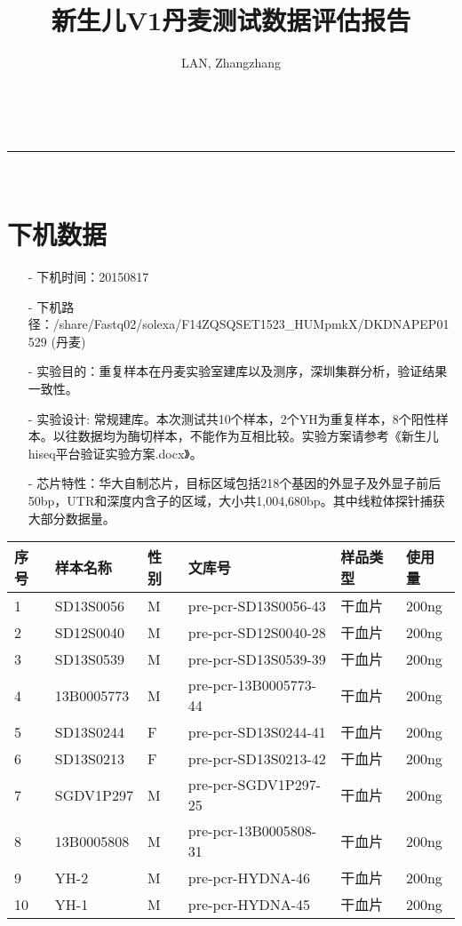 \documentclass[a4paper,11pt]{article}
\makeatletter
\newcommand{\linia}{\rule{\linewidth}{0.5pt}}
\newcommand{\tabcaption}{\def\@captype{table}\caption}
\theoremstyle{mytheor}
\renewcommand{\maketitle}{
	\begin{center}
	\vspace{2ex}
	{\huge \textsc{\@title}}
	\vspace{1ex}
	\\
		\linia\\
		\@author \hfill \@date
		\vspace{4ex}
	\end{center}
}
\makeatother
\begin{document}
\begin{CJK*}{UTF8}{gbsn}

\title{新生儿V1丹麦测试数据评估报告}
\author{LAN, Zhangzhang}
\maketitle

\section{下机数据}
\begin{itemize}\setlength{\itemsep}{0pt}
\item[-] 下机时间：20150817
\item[-] 下机路径：/share/Fastq02/solexa/F14ZQSQSET1523\_HUMpmkX/DKDNAPEP01529 (丹麦)
\item[-] 实验目的：重复样本在丹麦实验室建库以及测序，深圳集群分析，验证结果一致性。
\item[-] 实验设计: 常规建库。本次测试共10个样本，2个YH为重复样本，8个阳性样本。以往数据均为酶切样本，不能作为互相比较。实验方案请参考《新生儿hiseq平台验证实验方案.docx》。
\item[-] 芯片特性：华大自制芯片，目标区域包括218个基因的外显子及外显子前后50bp，UTR和深度内含子的区域，大小共1,004,680bp。其中线粒体探针捕获大部分数据量。
\end{itemize}


\begin{center}
\fontsize{10}{12} \selectfont
\begin{tabular}[t]{l|l|l|l|l|l}
\hline
序号	&	样本名称	&	性别	&	 文库号	&	样品类型	&	使用量	\\
\hline
1	&	SD13S0056	&	M	&	pre-pcr-SD13S0056-43	&	干血片	&	200ng	\\
2	&	SD12S0040	&	M	&	pre-pcr-SD12S0040-28	&	干血片	&	200ng	\\
3	&	SD13S0539	&	M	&	pre-pcr-SD13S0539-39	&	干血片	&	200ng	\\
4	&	13B0005773	&	M	&	pre-pcr-13B0005773-44	&	干血片	&	200ng	\\
5	&	SD13S0244	&	F	&	pre-pcr-SD13S0244-41	&	干血片	&	200ng	\\
6	&	SD13S0213	&	F	&	pre-pcr-SD13S0213-42	&	干血片	&	200ng	\\
7	&	SGDV1P297	&	M	&	pre-pcr-SGDV1P297-25	&	干血片	&	200ng	\\
8	&	13B0005808	&	M	&	pre-pcr-13B0005808-31	&	干血片	&	200ng	\\
9	&	YH-2	&	M	&	pre-pcr-HYDNA-46	&	干血片	&	200ng	\\
10	&	YH-1	&	M	&	pre-pcr-HYDNA-45	&	干血片	&	200ng	\\
\hline
\end{tabular}
\tabcaption{测试样本列表}
\end{center}


\end{CJK*}
\end{document}
